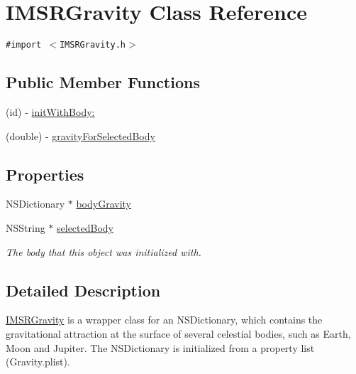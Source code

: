 \hypertarget{interface_i_m_s_r_gravity}{
\section{IMSRGravity Class Reference}
\label{interface_i_m_s_r_gravity}
}
{\tt \#import $<$IMSRGravity.h$>$}

\subsection*{Public Member Functions}
\begin{CompactItemize}
\item 
(id) - \hyperlink{interface_i_m_s_r_gravity_aae51c34df822f8f522828f802a3a80d}{initWithBody:}
\item 
(double) - \hyperlink{interface_i_m_s_r_gravity_12e427cd2462057b15f1ef74b6c5a535}{gravityForSelectedBody}
\end{CompactItemize}
\subsection*{Properties}
\begin{CompactItemize}
\item 
NSDictionary $\ast$ \hyperlink{interface_i_m_s_r_gravity_10084c6f12251d97bf8238a05990a9d6}{bodyGravity}
\item 
\hypertarget{interface_i_m_s_r_gravity_cac09b23a211629dc639543b1b34f545}{
NSString $\ast$ \hyperlink{interface_i_m_s_r_gravity_cac09b23a211629dc639543b1b34f545}{selectedBody}}
\label{interface_i_m_s_r_gravity_cac09b23a211629dc639543b1b34f545}

\begin{CompactList}\small\item\em The body that this object was initialized with. \item\end{CompactList}\end{CompactItemize}


\subsection{Detailed Description}
\hyperlink{interface_i_m_s_r_gravity}{IMSRGravity} is a wrapper class for an NSDictionary, which contains the gravitational attraction at the surface of several celestial bodies, such as Earth, Moon and Jupiter. The NSDictionary is initialized from a property list (Gravity.plist).

